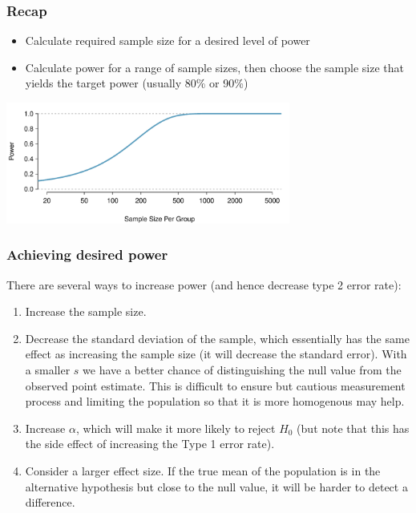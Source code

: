 
\begin{frame}
\frametitle{Recap}

\begin{itemize}
\item Calculate required sample size for a desired level of power
\item Calculate power for a range of sample sizes, then choose the sample size that yields the target power (usually 80\% or 90\%)
\end{itemize}
\begin{center}
\includegraphics[width=0.7\textwidth]{5-4_power/figures/power/power_curve_neg-3}
\end{center}

\end{frame}


\begin{frame}
\frametitle{Achieving desired power}

There are several ways to increase power (and hence decrease type 2 error rate):

\pause

{\small
\begin{enumerate}

\item Increase the sample size.

\pause

\item Decrease the standard deviation of the sample, which essentially has the same effect as increasing the sample size (it will decrease the standard error). With a smaller $s$ we have a better chance of distinguishing the null value from the observed point estimate. This is difficult to ensure but cautious measurement process and limiting the population so that it is more homogenous may help.

\pause

\item Increase $\alpha$, which will make it more likely to reject $H_0$ (but note that this has the side effect of increasing the Type 1 error rate).

\pause

\item Consider a larger effect size. If the true mean of the population is in the alternative hypothesis but close to the null value, it will be harder to detect a difference.

\end{enumerate}
}

\end{frame}

